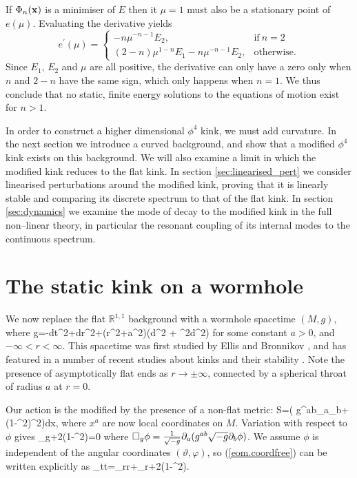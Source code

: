 If $\Phi_n({\bf x})$ is a minimiser of $E$ then it $\mu=1$ must also be a stationary point of $e(\mu)$. Evaluating the derivative yields
\[
e^\prime(\mu)= \begin{cases}
      -n\mu^{-n-1}E_2, & \text{if}\ n=2 \\
      (2-n)\mu^{1-n}E_1 -n\mu^{-n-1}E_2, & \text{otherwise}.
    \end{cases}
\]
Since $E_1$, $E_2$ and $\mu$ are all positive, the derivative can only have a zero only when $n$ and $2-n$ have the same sign, which only happens when $n=1$. We thus conclude that no static, finite energy solutions to the equations of motion exist for $n>1$.

In order to construct a higher dimensional $\phi^4$ kink, we must add curvature. In the next section we introduce a curved background, and show that a modified $\phi^4$ kink exists on this background. We will also examine a limit in which the modified kink reduces to the flat kink. In section \ref{sec:linearised_pert} we consider linearised perturbations around the modified kink, proving that it is linearly stable and comparing its discrete spectrum to that of the flat kink. In section \ref{sec:dynamics} we examine the mode of decay to the modified kink in the full non--linear theory, in particular the resonant coupling of its internal modes to the continuous spectrum.

\section{The static kink on a wormhole}

We now replace the flat $\mathbb{R}^{1,1}$ background with a wormhole spacetime $(M,g)$, where
\be
\nonumber
g=-dt^2+dr^2+(r^2+a^2)(d\vartheta^2 + \sin^2\vartheta d\varphi^2)
\ee
for some constant $a>0$, and $-\infty<r<\infty$. This spacetime was first studied by Ellis \cite{Ellis} and Bronnikov \cite{Bronnikov}, and has featured in a number of recent studies about kinks and their stability \cite{wavemaps,SG}. Note the presence of asymptotically flat ends as $r\rightarrow\pm\infty$, connected by a spherical throat of radius $a$ at $r=0$.

Our action is the modified by the presence of a non-flat metric:
\be
\nonumber
S=\int\bigg( g^{ab}\p_a\phi\p_b\phi + (1-\phi^2)^2\bigg)dx,
\ee
where $x^a$ are now local coordinates on $M$. Variation with respect to $\phi$ gives
\be
\label{eom.coordfree}
\square_g\phi+2\phi(1-\phi^2)=0
\ee
where $\square_g\phi=\frac{1}{\sqrt{-g}}\partial_a(g^{ab}\sqrt{-g}\partial_b\phi)$. We assume $\phi$ is independent of the angular coordinates $(\vartheta,\varphi)$, so (\ref{eom.coordfree}) can be written explicitly as
\be
\label{eom.coords}
\phi_{tt}=\phi_{rr}+\phi_r+2\phi(1-\phi^2).
\ee

